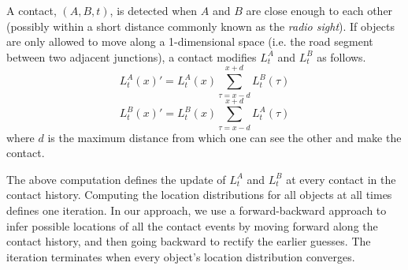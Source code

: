 


A contact, $(A, B, t)$, is detected when $A$ and $B$ are 
close enough to each other (possibly within a short distance commonly known 
as the {\em radio sight}). If objects are only allowed to move along a
1-dimensional space (i.e. the road segment between two adjacent junctions), 
a contact modifies $L_t^A$ and $L_t^B$ as follows.
\begin{equation}\label{eqn:contact_proba} 
{L_t^A(x)}' = L_t^A(x)\sum _{ \tau = x-d  }^{x+d  }{ L_t^B(\tau)} 
\end{equation}
\begin{equation}\label{eqn:contact_probb}
{L_t^B(x)}' = L_t^B(x)\sum _{ \tau = x-d  }^{x+d  }{ L_t^A(\tau)} 
\end{equation}
where $d$ is the maximum distance from which one can see the other and
make the contact. 

The above computation defines the update of $L_t^A$ and $L_t^B$ 
at every contact in the contact history. Computing the location distributions
for all objects at all times defines one iteration.
In our approach, we use a forward-backward approach
to infer possible locations of all the contact events by moving
forward along the contact history, and then going backward to rectify the
earlier guesses. The iteration terminates when every object's 
location distribution converges. 

